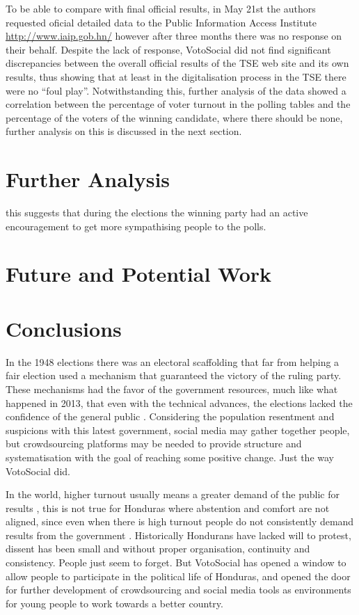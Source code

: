 \documentclass[letterpaper,10pt]{article}
\begin{document}
To be able to compare with final official results, in May 21st the authors requested oficial detailed data to the Public Information Access Institute \url{http://www.iaip.gob.hn/} however after three months there was no response on their behalf. Despite the lack of response, VotoSocial did not find significant discrepancies between the overall official results of the TSE web site and its own results, thus showing that at least in the digitalisation process in the TSE there were no ``foul play''. Notwithstanding this, further analysis of the data showed a correlation between the percentage of voter turnout in the polling tables and the percentage of the voters of the winning candidate, where there should be none, further analysis on this is discussed in the next section.




\section{Further Analysis}
this suggests that during the elections the winning party had an active encouragement to get more sympathising people to the polls.
\section{Future and Potential Work}

\section{Conclusions}


In the 1948 elections there was an electoral scaffolding that far from helping a fair election used a mechanism that guaranteed the victory of the ruling party. These mechanisms had the favor of the government resources, much like what happened in 2013, that even with the technical advances, the elections lacked the confidence of the general public \citep{romero2014}. Considering the population resentment and suspicions with this latest government, social media may gather together people, but crowdsourcing platforms may be needed to provide structure and systematisation with the goal of reaching some positive change. Just the way VotoSocial did.


In the world, higher turnout usually means a greater demand of the public for results \citep{mac2003}, this is not true for Honduras where abstention and comfort are not aligned, since even when there is high turnout people do not consistently demand results from the government \citep{romero2014}. Historically Hondurans have lacked will to protest, dissent has been small and without proper organisation, continuity and consistency. People just seem to forget. But VotoSocial has opened a window to allow people to participate in the political life of Honduras, and opened the door for further development of crowdsourcing and social media tools as environments for young people to work towards a better country.


\newpage




\end{document}
